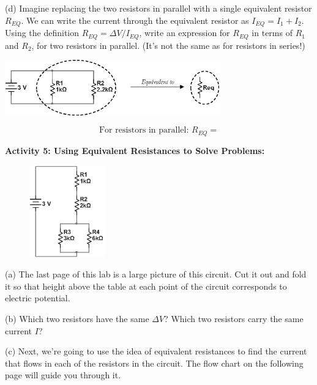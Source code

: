 (d) Imagine replacing the two resistors in parallel with a single equivalent resistor $R_{EQ}$.   We can write the current through the equivalent resistor as $I_{EQ}=I_1+I_2$.  Using the definition $R_{EQ}=  \Delta V \slash I_{EQ}$, write an expression for $R_{EQ}$ in terms of $R_1$ and $R_2$, for two resistors in parallel.  (It's not the same as for resistors in series!)

\begin{center}
\includegraphics[width=0.7\textwidth]{electric_circuits2/parallel_equiv_bw.eps}
\answerspace{1 in}
\end{center}

\begin{displaymath}
\textrm{For resistors in parallel: } R_{EQ} = 
\end{displaymath}

\textbf{Activity 5: Using Equivalent Resistances to Solve Problems:}

\begin{figure}
    \vspace{-0.3 in}
    \includegraphics[width=0.29\textwidth]{electric_circuits2/circ_diag6_bw.eps}
\end{figure}

(a) The last page of this lab is a large picture of this circuit.  Cut it out and fold it so that height above the table at each point of the circuit corresponds to electric potential.  

(b) Which two resistors have the same $\Delta V$?  Which two resistors carry the same current $I$?
\answerspace{0.6 in}

(c) Next, we're going to use the idea of equivalent resistances to find the current that flows in each of the resistors in the circuit.  The flow chart on the following page will guide you through it.

